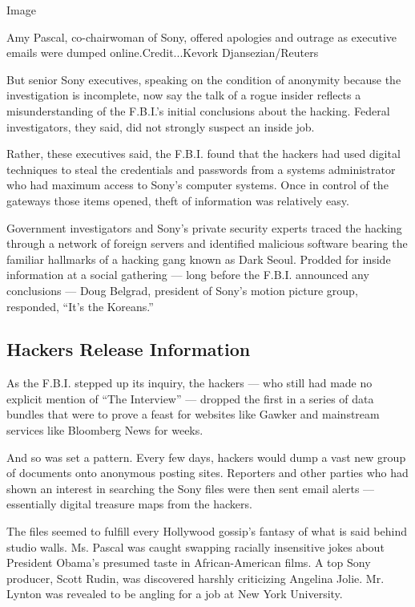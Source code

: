 Image

Amy Pascal, co-chairwoman of Sony, offered apologies and outrage as
executive emails were dumped online.Credit...Kevork Djansezian/Reuters

But senior Sony executives, speaking on the condition of anonymity
because the investigation is incomplete, now say the talk of a rogue
insider reflects a misunderstanding of the F.B.I.'s initial conclusions
about the hacking. Federal investigators, they said, did not strongly
suspect an inside job.

Rather, these executives said, the F.B.I. found that the hackers had
used digital techniques to steal the credentials and passwords from a
systems administrator who had maximum access to Sony's computer systems.
Once in control of the gateways those items opened, theft of information
was relatively easy.

Government investigators and Sony's private security experts traced the
hacking through a network of foreign servers and identified malicious
software bearing the familiar hallmarks of a hacking gang known as Dark
Seoul. Prodded for inside information at a social gathering --- long
before the F.B.I. announced any conclusions --- Doug Belgrad, president
of Sony's motion picture group, responded, ``It's the Koreans.''

\hypertarget{hackers-release-information}{%
\subsection{Hackers Release
Information}\label{hackers-release-information}}

As the F.B.I. stepped up its inquiry, the hackers --- who still had made
no explicit mention of ``The Interview'' --- dropped the first in a
series of data bundles that were to prove a feast for websites like
Gawker and mainstream services like Bloomberg News for weeks.

And so was set a pattern. Every few days, hackers would dump a vast new
group of documents onto anonymous posting sites. Reporters and other
parties who had shown an interest in searching the Sony files were then
sent email alerts --- essentially digital treasure maps from the
hackers.

The files seemed to fulfill every Hollywood gossip's fantasy of what is
said behind studio walls. Ms. Pascal was caught swapping racially
insensitive jokes about President Obama's presumed taste in
African-American films. A top Sony producer, Scott Rudin, was discovered
harshly criticizing Angelina Jolie. Mr. Lynton was revealed to be
angling for a job at New York University.


